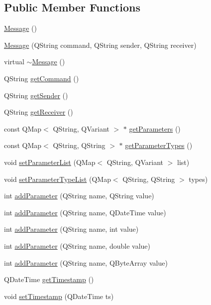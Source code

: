 \subsection*{Public Member Functions}
\begin{DoxyCompactItemize}
\item 
\hyperlink{class_message_a4fc4f717b634e66070366cb7722d7761}{Message} ()
\item 
\hyperlink{class_message_a5e8126d19b5dbc34db32273bbbeb10d9}{Message} (Q\+String command, Q\+String sender, Q\+String receiver)
\item 
virtual \hyperlink{class_message_a3f7275462831f787a861271687bcad67}{$\sim$\+Message} ()
\item 
Q\+String \hyperlink{class_message_a957a27e1733adc99208fd220bf21671d}{get\+Command} ()
\item 
Q\+String \hyperlink{class_message_a8de6319977b0ba2e1156f7f30f468ab3}{get\+Sender} ()
\item 
Q\+String \hyperlink{class_message_a628bc07c518f4f60be55500473001997}{get\+Receiver} ()
\item 
const Q\+Map$<$ Q\+String, Q\+Variant $>$ $\ast$ \hyperlink{class_message_a51d1f7130cceabe7b47a220d5f471268}{get\+Parameters} ()
\item 
const Q\+Map$<$ Q\+String, Q\+String $>$ $\ast$ \hyperlink{class_message_a4b5e040a732d394ec759afd1273ec81c}{get\+Parameter\+Types} ()
\item 
void \hyperlink{class_message_af0cd3cfcf400df803efb9e5a6a23d0df}{set\+Parameter\+List} (Q\+Map$<$ Q\+String, Q\+Variant $>$ list)
\item 
void \hyperlink{class_message_a87496e61666efca5fa20ec095d9ff1a8}{set\+Parameter\+Type\+List} (Q\+Map$<$ Q\+String, Q\+String $>$ types)
\item 
int \hyperlink{class_message_a92d813ec518fcb18816c7ea548b05941}{add\+Parameter} (Q\+String name, Q\+String value)
\item 
int \hyperlink{class_message_a55be3a8f0cb663fe95ced201ac57b091}{add\+Parameter} (Q\+String name, Q\+Date\+Time value)
\item 
int \hyperlink{class_message_a9b442945e30cac45b5c65c3f6c8716a7}{add\+Parameter} (Q\+String name, int value)
\item 
int \hyperlink{class_message_a1ead404f6a71966a9c8d2d016fcd7e9f}{add\+Parameter} (Q\+String name, double value)
\item 
int \hyperlink{class_message_a1f1e1ea213121e861157c82e6e7fd686}{add\+Parameter} (Q\+String name, Q\+Byte\+Array value)
\item 
Q\+Date\+Time \hyperlink{class_message_a662ed384ea3ce64bbbcb1438c59b4422}{get\+Timestamp} ()
\item 
void \hyperlink{class_message_a4ee4b7251846b719995b6de233c24853}{set\+Timestamp} (Q\+Date\+Time ts)
\end{DoxyCompactItemize}
